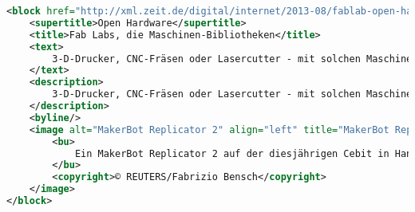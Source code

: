 \begin{lstlisting}[language= XML,caption=Das XML eines Teaserelements, label={lst:knopfxml}]
<block href="http://xml.zeit.de/digital/internet/2013-08/fablab-open-hardware" year="2013" issue="34" ressort="Digital" author="Tilman Baumgärtel" contenttype="article" publication-date="" expires="" date-last-modified="2013-08-14T12:58:40+00:00" date-first-released="2013-08-14T09:57:43.627551+00:00" date-last-published="2013-08-14T12:59:39.691370+00:00" last-semantic-change="2013-08-14T09:56:40.185797+00:00">
	<supertitle>Open Hardware</supertitle>
	<title>Fab Labs, die Maschinen-Bibliotheken</title>
	<text>
		3-D-Drucker, CNC-Fräsen oder Lasercutter - mit solchen Maschinen sollen Bastler in Fab Labs experimentieren. Immer mehr solcher Werkstätten entstehen nun in aller Welt.
	</text>
	<description>
		3-D-Drucker, CNC-Fräsen oder Lasercutter - mit solchen Maschinen sollen Bastler in Fab Labs experimentieren. Immer mehr solcher Werkstätten entstehen nun in aller Welt.
	</description>
	<byline/>
	<image alt="MakerBot Replicator 2" align="left" title="MakerBot Replicator 2" base-id="http://xml.zeit.de/digital/internet/2013-08/makerbot-cebit-hannover/" type="jpg" publication-date="" expires="">
		<bu>
			Ein MakerBot Replicator 2 auf der diesjährigen Cebit in Hannover
		</bu>
		<copyright>© REUTERS/Fabrizio Bensch</copyright>
	</image>
</block>
\end{lstlisting}